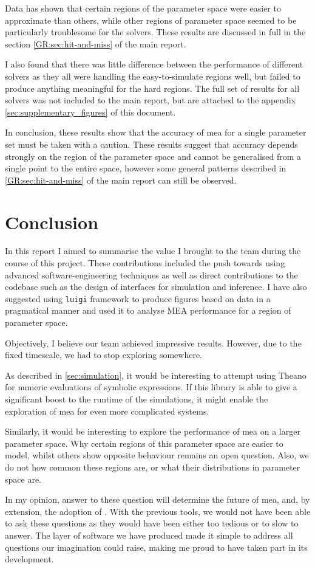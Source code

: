Data has shown that certain regions of the parameter space were easier to approximate than others, while other regions of parameter space seemed to be particularly troublesome for the solvers. 
These results are discussed in full in the section \autoref*{GR:sec:hit-and-miss} of the main report.

I also found that there was little difference between the performance of different solvers as they all were handling the easy-to-simulate regions well, but failed to produce anything meaningful for the hard regions.
The full set of results for all solvers was not included to the main report, but are attached to the appendix \autoref{sec:supplementary_figures} of this document.

In conclusion, these results show that the accuracy of \gls{mea} for a single parameter set must be taken with a caution. These results suggest that accuracy depends strongly on the region of the parameter space and cannot be generalised from a single point to the entire space, however some general patterns described in \autoref*{GR:sec:hit-and-miss} of the main report can still be observed.

\section{Conclusion}

In this report I aimed to summarise the value I brought to the team during the course of this project.
These contributions included the push towards using advanced software-engineering techniques as well as direct contributions to the codebase such as the design of interfaces for simulation and inference.
I have also suggested using \verb"luigi" framework to produce figures based on data in a pragmatical manner and
used it to analyse MEA performance for a region of parameter space.

Objectively, I believe our team achieved impressive results.
However, due to the fixed timescale, we had to stop exploring somewhere.

As described in \autoref{sec:simulation}, it would be interesting to attempt using Theano for numeric evaluations of symbolic expressions.
If this library is able to give a significant boost to the runtime of the simulations, it might enable the exploration of \gls{mea} for even more complicated systems.

Similarly, it would be interesting to explore the performance of \gls{mea} on a larger parameter space. Why certain regions of this parameter space are easier to model, whilst others show opposite behaviour remains an open question.
Also, we do not how common these regions are, or what their distributions in parameter space are.

In my opinion, answer to these question will determine the future of \gls{mea}, and, by extension, the adoption of \means.
With the previous tools, we would not have been able to ask these questions as they would have been either too tedious or to slow to answer.
The layer of software we have produced made it simple to address all questions our imagination could raise, making me proud to have taken part in its development.